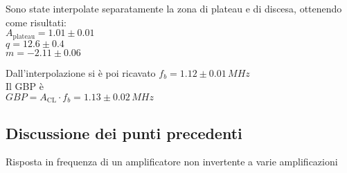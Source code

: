 Sono state interpolate separatamente la zona di plateau e di discesa, ottenendo come risultati:\\
$A_\textrm{plateau}=1.01 \pm 0.01$\\
$q = 12.6 \pm 0.4$\\
$m  = -2.11 \pm 0.06$

Dall'interpolazione si è poi ricavato 
$f_b=1.12\pm 0.01 \,MHz $\\
Il GBP è\\
$GBP=A_\textrm{CL} \cdot f_b  = 1.13 \pm 0.02 \,MHz$

\subsection{Discussione dei punti precedenti}

\begin{grafico}
 \centering 
  \resizebox{\textwidth}{!}{%
  
 }%
 \caption{Risposta in frequenza di un amplificatore non invertente a varie amplificazioni} 
 \label{gr:amp_noninv_all.tex} 
\end{grafico}


